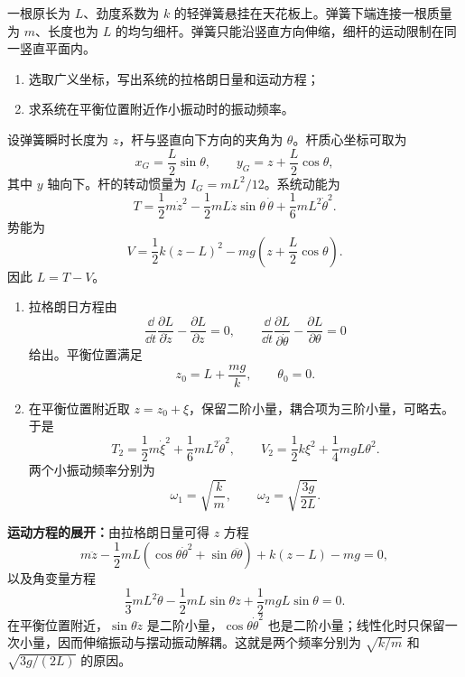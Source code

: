 \begin{question}[弹簧悬挂匀质杆]
一根原长为 $L$、劲度系数为 $k$ 的轻弹簧悬挂在天花板上。弹簧下端连接一根质量为 $m$、长度也为 $L$ 的均匀细杆。弹簧只能沿竖直方向伸缩，细杆的运动限制在同一竖直平面内。
\begin{enumerate}
  \item 选取广义坐标，写出系统的拉格朗日量和运动方程；
  \item 求系统在平衡位置附近作小振动时的振动频率。
\end{enumerate}

\begin{solution}
设弹簧瞬时长度为 $z$，杆与竖直向下方向的夹角为 $\theta$。杆质心坐标可取为
\[
  x_G=\frac L2\sin\theta,
  \qquad
  y_G=z+\frac L2\cos\theta,
\]
其中 $y$ 轴向下。杆的转动惯量为 $I_G=mL^2/12$。系统动能为
\[
  T=\frac12m\dot z^2-\frac12mL\dot z\sin\theta\,\dot\theta
    +\frac16mL^2\dot\theta^2.
\]
势能为
\[
  V=\frac12k(z-L)^2-mg\left(z+\frac L2\cos\theta\right).
\]
因此 $L=T-V$。
\begin{enumerate}
  \item 拉格朗日方程由
  \[
    \frac{\dd}{\dd t}\frac{\partial L}{\partial\dot z}
    -\frac{\partial L}{\partial z}=0,
    \qquad
    \frac{\dd}{\dd t}\frac{\partial L}{\partial\dot\theta}
    -\frac{\partial L}{\partial\theta}=0
  \]
  给出。平衡位置满足
  \[
    z_0=L+\frac{mg}{k},
    \qquad
    \theta_0=0.
  \]
  \item 在平衡位置附近取 $z=z_0+\xi$，保留二阶小量，耦合项为三阶小量，可略去。于是
  \[
    T_2=\frac12m\dot\xi^2+\frac16mL^2\dot\theta^2,
    \qquad
    V_2=\frac12k\xi^2+\frac14mgL\theta^2.
  \]
  两个小振动频率分别为
  \[
    \boxed{\omega_1=\sqrt{\frac{k}{m}}},
    \qquad
    \boxed{\omega_2=\sqrt{\frac{3g}{2L}}}.
  \]
\end{enumerate}


\medskip
\textbf{运动方程的展开：}由拉格朗日量可得 $z$ 方程
\[
  m\ddot z-\frac12mL(\cos\theta\dot\theta^2+\sin\theta\ddot\theta)
  +k(z-L)-mg=0,
\]
以及角变量方程
\[
  \frac13mL^2\ddot\theta-\frac12mL\sin\theta\ddot z
  +\frac12mgL\sin\theta=0.
\]
在平衡位置附近，$\sin\theta\ddot z$ 是二阶小量，$\cos\theta\dot\theta^2$ 也是二阶小量；线性化时只保留一次小量，因而伸缩振动与摆动振动解耦。这就是两个频率分别为 $\sqrt{k/m}$ 和 $\sqrt{3g/(2L)}$ 的原因。
\end{solution}
\end{question}


